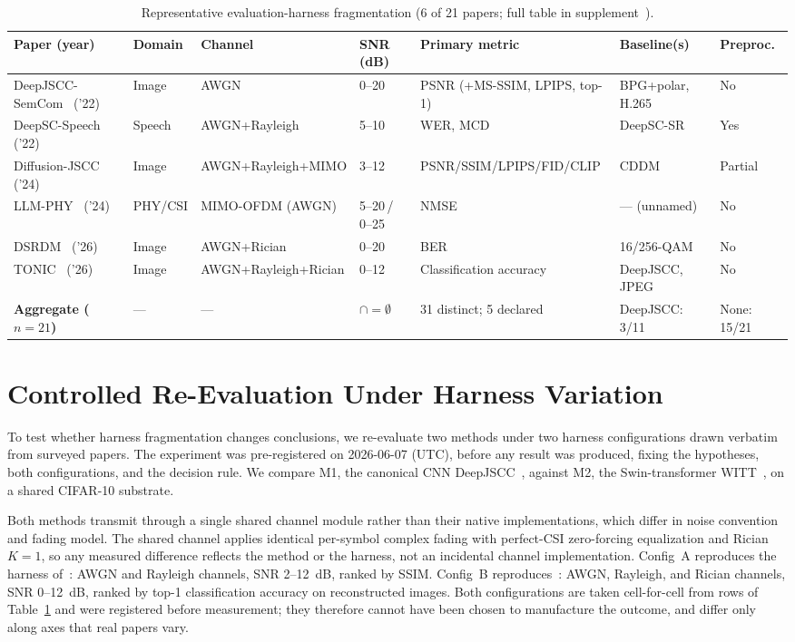 \documentclass[conference]{IEEEtran}
\begin{document}
\begin{table}[t]
\centering
\scriptsize
\setlength{\tabcolsep}{2pt}
\caption{Representative evaluation-harness fragmentation (6 of 21 papers; full table in supplement~\cite{repo}).}
\label{tab:frag}
\begin{tabular}{@{}lllllll@{}}
\toprule
Paper (year) & Domain & Channel & SNR (dB) & Primary metric & Baseline(s) & Preproc. \\
\midrule
DeepJSCC-SemCom~\cite{djscc_semcom} ('22) & Image & AWGN & 0--20 & PSNR (+MS-SSIM, LPIPS, top-1) & BPG+polar, H.265 & No \\
DeepSC-Speech~\cite{deepsc_speech} ('22) & Speech & AWGN+Rayleigh & 5--10 & WER, MCD & DeepSC-SR & Yes \\
Diffusion-JSCC~\cite{diffusion_jscc} ('24) & Image & AWGN+Rayleigh+MIMO & 3--12 & PSNR/SSIM/LPIPS/FID/CLIP & CDDM & Partial \\
LLM-PHY~\cite{llm_phy} ('24) & PHY/CSI & MIMO-OFDM (AWGN) & 5--20\,/\,0--25 & NMSE & --- (unnamed) & No \\
DSRDM~\cite{dsrdm} ('26) & Image & AWGN+Rician & 0--20 & BER & 16/256-QAM & No \\
TONIC~\cite{tonic} ('26) & Image & AWGN+Rayleigh+Rician & 0--12 & Classification accuracy & DeepJSCC, JPEG & No \\
\midrule
\textbf{Aggregate ($n{=}21$)} & --- & --- & $\cap=\emptyset$ & 31 distinct; 5 declared & DeepJSCC: 3/11 & None: 15/21 \\
\bottomrule
\end{tabular}
\end{table}

\section{Controlled Re-Evaluation Under Harness Variation}\label{sec:inversion}
To test whether harness fragmentation changes conclusions, we re-evaluate two methods
under two harness configurations drawn verbatim from surveyed papers. The experiment
was pre-registered on 2026-06-07 (UTC), before any result was produced, fixing the
hypotheses, both configurations, and the decision rule. We compare M1, the canonical
CNN DeepJSCC~\cite{deepjscc}, against M2, the Swin-transformer WITT~\cite{witt}, on a
shared CIFAR-10 substrate.

Both methods transmit through a single shared channel module rather than their native
implementations, which differ in noise convention and fading model. The shared channel
applies identical per-symbol complex fading with perfect-CSI zero-forcing equalization
and Rician $K=1$, so any measured difference reflects the method or the harness, not an
incidental channel implementation. Config~A reproduces the harness of~\cite{recvit}:
AWGN and Rayleigh channels, SNR 2--12~dB, ranked by SSIM. Config~B
reproduces~\cite{tonic}: AWGN, Rayleigh, and Rician channels, SNR 0--12~dB, ranked by
top-1 classification accuracy on reconstructed images. Both configurations are taken
cell-for-cell from rows of Table~\ref{tab:frag} and were registered before measurement;
they therefore cannot have been chosen to manufacture the outcome, and differ only along
axes that real papers vary.
\end{document}
